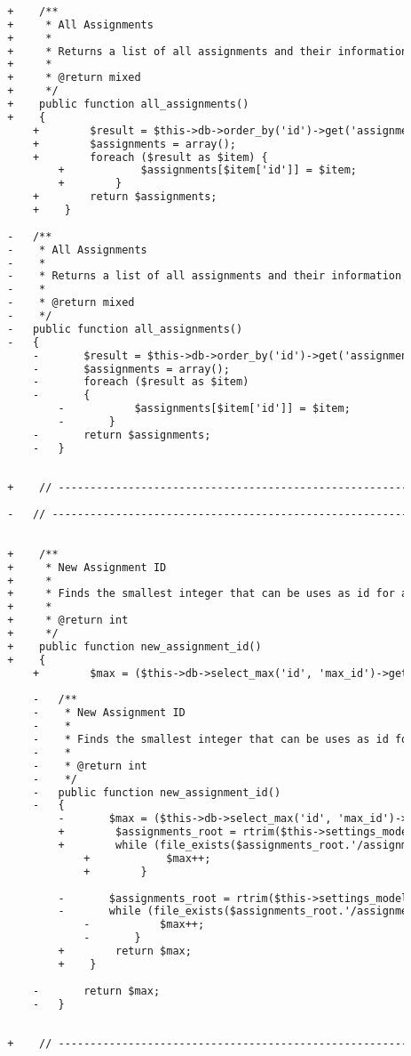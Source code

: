\begin{lstlisting}[language=diff, caption=Perubahan pada kode Assignment\_model.php]
		
		+    /**
		+     * All Assignments
		+     *
		+     * Returns a list of all assignments and their information
		+     *
		+     * @return mixed
		+     */
		+    public function all_assignments()
		+    {
			+        $result = $this->db->order_by('id')->get('assignments')->result_array();
			+        $assignments = array();
			+        foreach ($result as $item) {
				+            $assignments[$item['id']] = $item;
				+        }
			+        return $assignments;
			+    }
		
		-	/**
		-	 * All Assignments
		-	 *
		-	 * Returns a list of all assignments and their information
		-	 *
		-	 * @return mixed
		-	 */
		-	public function all_assignments()
		-	{
			-		$result = $this->db->order_by('id')->get('assignments')->result_array();
			-		$assignments = array();
			-		foreach ($result as $item)
			-		{
				-			$assignments[$item['id']] = $item;
				-		}
			-		return $assignments;
			-	}
		
		
		+    // ------------------------------------------------------------------------
		
		-	// ------------------------------------------------------------------------
		
		
		+    /**
		+     * New Assignment ID
		+     *
		+     * Finds the smallest integer that can be uses as id for a new assignment
		+     *
		+     * @return int
		+     */
		+    public function new_assignment_id()
		+    {
			+        $max = ($this->db->select_max('id', 'max_id')->get('assignments')->row()->max_id) + 1;
			
			-	/**
			-	 * New Assignment ID
			-	 *
			-	 * Finds the smallest integer that can be uses as id for a new assignment
			-	 *
			-	 * @return int
			-	 */
			-	public function new_assignment_id()
			-	{
				-		$max = ($this->db->select_max('id', 'max_id')->get('assignments')->row()->max_id) + 1;
				+        $assignments_root = rtrim($this->settings_model->get_setting('assignments_root'), '/');
				+        while (file_exists($assignments_root.'/assignment_'.$max)) {
					+            $max++;
					+        }
				
				-		$assignments_root = rtrim($this->settings_model->get_setting('assignments_root'), '/');
				-		while (file_exists($assignments_root.'/assignment_'.$max)){
					-			$max++;
					-		}
				+        return $max;
				+    }
			
			-		return $max;
			-	}
		
		
		+    // ------------------------------------------------------------------------
		

\end{lstlisting}
